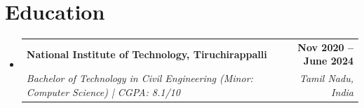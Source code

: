 \documentclass[letterpaper,11pt]{article}
\makeatletter
\newcommand{\resumeSubheading}[4]{
  \vspace{-2pt}\item
    \begin{tabular*}{1.0\textwidth}[t]{l@{\extracolsep{\fill}}r}
      \textbf{#1} & \textbf{\small #2} \\
      \textit{\small#3} & \textit{\small #4} \\
    \end{tabular*}\vspace{-8pt}
}
\newcommand{\resumeSubHeadingListStart}{\begin{itemize}[leftmargin=0.0in, label={}]}
\newcommand{\resumeSubHeadingListEnd}{\end{itemize}}
\makeatother
\begin{document}
\section{Education}
  \resumeSubHeadingListStart
    \resumeSubheading
      {National Institute of Technology, Tiruchirappalli}{Nov 2020 -- June 2024}
      {Bachelor of Technology in Civil Engineering (Minor: Computer Science) | CGPA: 8.1/10}{Tamil Nadu, India}
  \resumeSubHeadingListEnd
  
\end{document}
